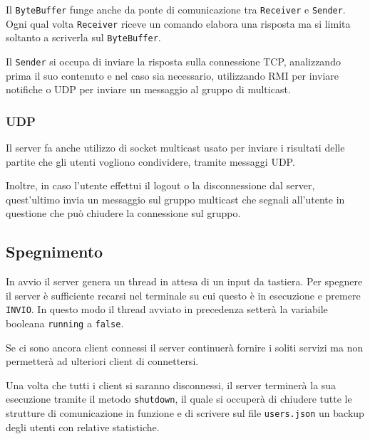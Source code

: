 Il \verb|ByteBuffer| funge anche da ponte di comunicazione tra \verb|Receiver| e
\verb|Sender|. Ogni qual volta \verb|Receiver| riceve un comando elabora una risposta ma si limita
soltanto a scriverla sul \verb|ByteBuffer|.

Il \verb|Sender| si occupa di inviare la risposta sulla connessione TCP, analizzando prima il suo
contenuto e nel caso sia necessario, utilizzando RMI per inviare notifiche o UDP per inviare un
messaggio al gruppo di multicast.

\subsubsection{UDP}
Il server fa anche utilizzo di socket multicast usato per inviare i risultati delle partite che
gli utenti vogliono condividere, tramite messaggi UDP.

Inoltre, in caso l'utente effettui il logout o la disconnessione dal server, quest'ultimo invia
un messaggio sul gruppo multicast che segnali all'utente in questione che può chiudere la
connessione sul gruppo.

\subsection{Spegnimento}
In avvio il server genera un thread in attesa di un input da tastiera. Per spegnere il server è
sufficiente recarsi nel terminale su cui questo è in esecuzione e premere \verb|INVIO|. In questo
modo il thread avviato in precedenza setterà la variabile booleana \verb|running| a \verb|false|.

Se ci sono ancora client connessi il server continuerà fornire i soliti servizi ma non permetterà
ad ulteriori client di connettersi.

Una volta che tutti i client si saranno disconnessi, il server terminerà la sua esecuzione tramite
il metodo \verb|shutdown|, il quale si occuperà di chiudere tutte le strutture di comunicazione
in funzione e di scrivere sul file \verb|users.json| un backup degli utenti con relative
statistiche.